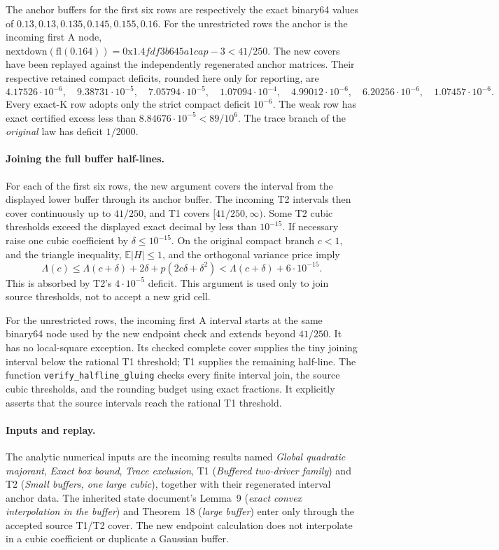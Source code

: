 The anchor buffers for the first six rows are respectively the exact
binary64 values of \(0.13,0.13,0.135,0.145,0.155,0.16\).
For the unrestricted rows the anchor is the incoming first A node,
\(\mathrm{nextdown}(\mathrm{fl}(0.164))
 =0\mathrm{x}1.4fdf3b645a1cap{-}3<41/250\).
The new covers have been replayed against the independently regenerated
anchor matrices. Their respective retained compact deficits, rounded
here only for reporting, are
\[
 4.17526\cdot10^{-6},\quad9.38731\cdot10^{-5},\quad
 7.05794\cdot10^{-5},\quad1.07094\cdot10^{-4},\quad
 4.99012\cdot10^{-6},\quad6.20256\cdot10^{-6},\quad
 1.07457\cdot10^{-6}.
\]
Every exact-K row adopts only the strict compact deficit \(10^{-6}\).
The weak row has exact certified excess less than
\(8.84676\cdot10^{-5}<89/10^6\). The trace branch of the
\emph{original} law has deficit \(1/2000\).

\paragraph{Joining the full buffer half-lines.}
For each of the first six rows, the new argument covers the interval
from the displayed lower buffer through its anchor buffer. The incoming
T2 intervals then cover continuously up to \(41/250\), and T1 covers
\([41/250,\infty)\).
Some T2 cubic thresholds exceed the displayed exact decimal by less
than \(10^{-15}\). If necessary raise one cubic coefficient by
\(\delta\le10^{-15}\). On the original compact branch \(c<1\), and
the triangle inequality, \(\mathbb E|H|\le1\), and the orthogonal
variance price imply
\[
 \Lambda(c)\le\Lambda(c+\delta)
          +2\delta+p(2c\delta+\delta^2)
 <\Lambda(c+\delta)+6\cdot10^{-15}.
\]
This is absorbed by T2's \(4\cdot10^{-5}\) deficit. This argument is
used only to join source thresholds, not to accept a new grid cell.

For the unrestricted rows, the incoming first A interval starts at the
same binary64 node used by the new endpoint check and extends beyond
\(41/250\). It has no local-square exception. Its checked complete
cover supplies the tiny joining interval below the rational T1
threshold; T1 supplies the remaining half-line.
The function \texttt{verify\_halfline\_gluing} checks every finite
interval join, the source cubic thresholds, and the rounding budget
using exact fractions. It explicitly asserts that the source intervals
reach the rational T1 threshold.

\paragraph{Inputs and replay.}
The analytic numerical inputs are the incoming results named
\emph{Global quadratic majorant}, \emph{Exact box bound},
\emph{Trace exclusion}, T1 (\emph{Buffered two-driver family}) and
T2 (\emph{Small buffers, one large cubic}), together with their
regenerated interval anchor data. The inherited state document's
Lemma~9 (\emph{exact convex interpolation in the buffer}) and
Theorem~18 (\emph{large buffer}) enter only through the accepted
source T1/T2 cover. The new endpoint calculation does not interpolate
in a cubic coefficient or duplicate a Gaussian buffer.

